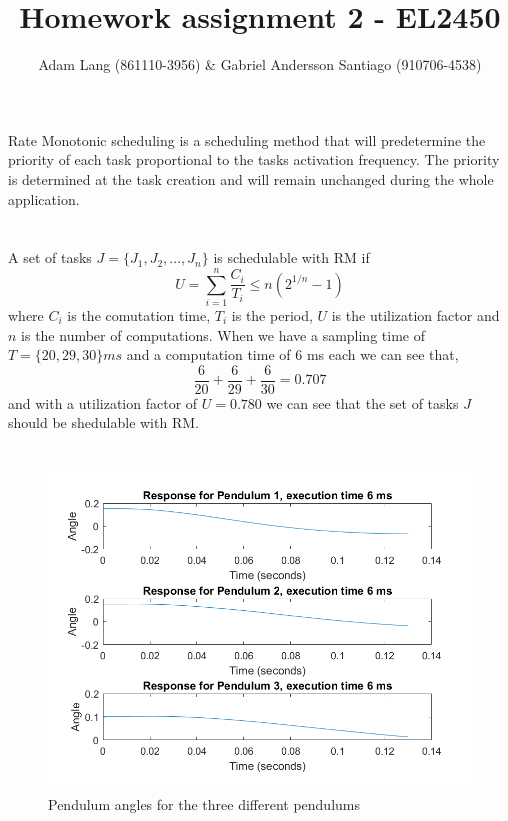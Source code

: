 \documentclass[12pt,a4paper]{article}
\title{Homework assignment 2 - EL2450}
\author{Adam Lang (861110-3956) \& Gabriel Andersson Santiago
(910706-4538)}
\begin{document}
\maketitle
\section{} %
  Rate Monotonic scheduling is a scheduling method that will
  predetermine the priority of each task proportional to the tasks
  activation frequency. The priority is determined at the task creation
  and will remain unchanged during the whole application.

\section{} %
  A set of tasks $J=\{J_1,J_2,...,J_n\}$ is schedulable with RM if
  \begin{equation}
    U=\sum\limits_{i=1}^n \frac{C_i}{T_i} \leq n(2^{1/n}-1)
  \end{equation}
  where $C_i$ is the comutation time, $T_i$ is the period, $U$ is the
  utilization factor and $n$ is the
  number of computations. When we have a sampling time of 
  $T=\{20, 29, 30\}ms$ and a computation time of 6 ms each we can see that,
  \begin{equation}
    \frac{6}{20}+\frac{6}{29}+\frac{6}{30}=0.707
  \end{equation}
  and with a utilization factor of $U = 0.780$ we can see that the set
  of tasks $J$ should be shedulable with RM.

\section{}%
    \begin{center}
      \begin{figure}
        \includegraphics[scale=0.5]{ex31.png}
        \caption{Pendulum angles for the three different pendulums}
      \end{figure}
    \end{center}
    
\end{document}
